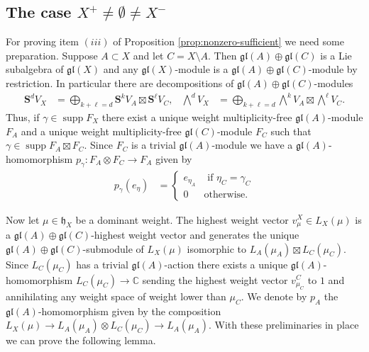 \documentclass[11pt,fleqn]{amsart}
\newcommand\CC{\mathbb C}
\renewcommand\to{\longrightarrow}
\theoremstyle{definition}
\theoremstyle{remark}
\theoremstyle{remark}
\newcommand\gl{\mathfrak{gl}}
\renewcommand\SS{\mathbf S}
\newcommand\lie[1]{\mathfrak{#1}}
\DeclareMathOperator\supp{supp}
\begin{document}
\subsection{The case $X^+ \neq \emptyset \neq X^-$}
\label{ss:nonzero-ggcurly}
For proving item $(iii)$ of Proposition \ref{prop:nonzero-sufficient} we need 
some preparation. 
Suppose $A \subset X$ and let $C = X \setminus A$. Then $\gl(A) \oplus \gl(C)$
is a Lie subalgebra of $\gl(X)$ and any $\gl(X)$-module is a $\gl(A) \oplus 
\gl(C)$-module by restriction. In particular there are decompositions of 
$\gl(A) \oplus \gl(C)$-modules
\begin{align*}
  \SS^dV_X
    &=\bigoplus_{k+\ell = d} \SS^k V_A \boxtimes \SS^\ell V_C,
  &\bigwedge^d V_X
    &=\bigoplus_{k+\ell = d} \bigwedge^k V_A \boxtimes \bigwedge^\ell V_C.
\end{align*}
Thus, if $\gamma \in \supp F_X$ there exist a unique weight multiplicity-free 
$\gl(A)$-module $F_A$ and a unique weight multiplicity-free $\gl(C)$-module 
$F_C$ such that $\gamma \in \supp F_A \boxtimes F_C$. Since $F_C$ is a trivial 
$\gl(A)$-module we have a $\gl(A)$-homomorphism $p_\gamma: F_A \otimes F_C \to 
F_A$ given by
\begin{align*}
p_\gamma(e_\eta) 
  &= \begin{cases}
    e_{\eta_A} & \mbox{ if } \eta_C = \gamma_C \\
    0          & \mbox{otherwise.}
  \end{cases}  
\end{align*}

Now let $\mu \in \lie h_X$ be a dominant weight. The highest weight 
vector $v_\mu^X \in L_X(\mu)$ is a $\gl(A) \oplus \gl(C)$-highest weight 
vector and generates the unique $\gl(A) \oplus \gl(C)$-submodule of $L_X(\mu)$ 
isomorphic to $L_A(\mu_A) \boxtimes L_C(\mu_C)$. Since $L_C(\mu_C)$ has a 
trivial $\gl(A)$-action there exists a unique $\gl(A)$-homomorphism $L_C(\mu_C) 
\to \CC$ sending the highest weight vector $v_{\mu_C}^C$ to $1$ and annihilating
any weight space of weight lower than $\mu_C$. We denote by $p_A$ the 
$\gl(A)$-homomorphism given by the composition $L_X(\mu) \to L_A(\mu_A) \otimes 
L_C(\mu_C) \to L_A(\mu_A)$. With these preliminaries in place we can prove the 
following lemma.
\end{document}
